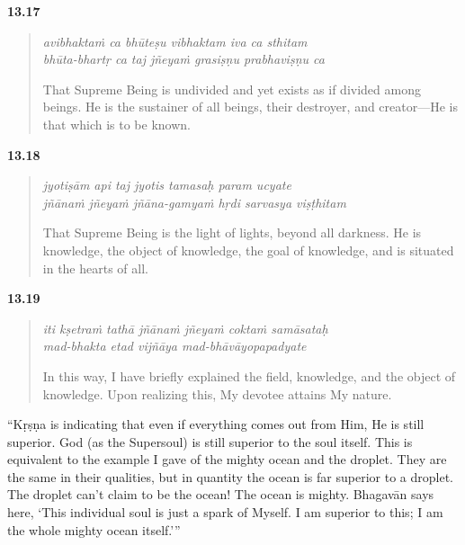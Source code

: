 \par\noindent\textbf{13.17}\par
\begin{verse}
\textit{avibhaktaṁ ca bhūteṣu vibhaktam iva ca sthitam} \\
\textit{bhūta-bhartṛ ca taj jñeyaṁ grasiṣṇu prabhaviṣṇu ca}

\noindent That Supreme Being is undivided and yet exists as if divided among beings. He is the sustainer of all beings, their destroyer, and creator---He is that which is to be known.
\end{verse}
\par



\par\noindent\textbf{13.18}\par
\begin{verse}
\textit{jyotiṣām api taj jyotis tamasaḥ param ucyate} \\
\textit{jñānaṁ jñeyaṁ jñāna-gamyaṁ hṛdi sarvasya viṣṭhitam}

\noindent That Supreme Being is the light of lights, beyond all darkness. He is knowledge, the object of knowledge, the goal of knowledge, and is situated in the hearts of all.
\end{verse}
\par



\par\noindent\textbf{13.19}\par
\begin{verse}
\textit{iti kṣetraṁ tathā jñānaṁ jñeyaṁ coktaṁ samāsataḥ} \\
\textit{mad-bhakta etad vijñāya mad-bhāvāyopapadyate}

\noindent In this way, I have briefly explained the field, knowledge, and the object of knowledge. Upon realizing this, My devotee attains My nature.
\end{verse}
\par


\enquote{Kṛṣṇa is indicating that even if everything comes out from Him, He is still superior. God (as the Supersoul) is still superior to the soul itself. This is equivalent to the example I gave of the mighty ocean and the droplet. They are the same in their qualities, but in quantity the ocean is far superior to a droplet. The droplet can’t claim to be the ocean! The ocean is mighty. Bhagavān says here, \enquote{This individual soul is just a spark of Myself. I am superior to this; I am the whole mighty ocean itself.}}

